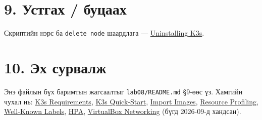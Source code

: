 \hypertarget{ux443ux441ux442ux433ux430ux445-ux431ux443ux446ux430ux430ux445}{%
\section{9. Устгах / буцаах}\label{ux443ux441ux442ux433ux430ux445-ux431ux443ux446ux430ux430ux445}}

\begin{Shaded}
\begin{Highlighting}[]
\OperatorTok{\textless{}}\OperatorTok{\textgreater{}}

\KeywordTok{\&\&} \KeywordTok{\&\&} 

\end{Highlighting}
\end{Shaded}

Скриптийн нэрс ба \texttt{delete\ node} шаардлага --- \href{https://docs.k3s.io/installation/uninstall}{Uninstalling K3s}.

\hypertarget{ux44dux445-ux441ux443ux440ux432ux430ux43bux436}{%
\section{10. Эх сурвалж}\label{ux44dux445-ux441ux443ux440ux432ux430ux43bux436}}

Энэ файлын бүх баримтын жагсаалтыг \texttt{lab08/README.md} §9-өөс үз. Хамгийн чухал нь: \href{https://docs.k3s.io/installation/requirements}{K3s Requirements}, \href{https://docs.k3s.io/quick-start}{K3s Quick-Start}, \href{https://docs.k3s.io/add-ons/import-images}{Import Images}, \href{https://docs.k3s.io/reference/resource-profiling}{Resource Profiling}, \href{https://kubernetes.io/docs/reference/labels-annotations-taints/}{Well-Known Labels}, \href{https://kubernetes.io/docs/concepts/workloads/autoscaling/horizontal-pod-autoscale/}{HPA}, \href{https://www.virtualbox.org/manual/topics/networkingdetails.html}{VirtualBox Networking} (бүгд 2026-09-д хандсан).
